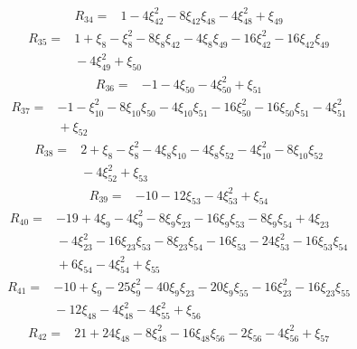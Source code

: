 \[
\begin{aligned}
 R_{34}={}&1-4\xi_{42}^{2}-8\xi_{42}\xi_{48}-4\xi_{48}^{2}+\xi_{49}
\end{aligned}
\]
\[
\begin{aligned}
 R_{35}={}&1+\xi_{8}-\xi_{8}^{2}-8\xi_{8}\xi_{42}-4\xi_{8}\xi_{49}-16\xi_{42}^{2}-16\xi_{42}\xi_{49}\\
 &{}-4\xi_{49}^{2}+\xi_{50}
\end{aligned}
\]
\[
\begin{aligned}
 R_{36}={}&-1-4\xi_{50}-4\xi_{50}^{2}+\xi_{51}
\end{aligned}
\]
\[
\begin{aligned}
 R_{37}={}&-1-\xi_{10}^{2}-8\xi_{10}\xi_{50}-4\xi_{10}\xi_{51}-16\xi_{50}^{2}-16\xi_{50}\xi_{51}-4\xi_{51}^{2}\\
 &{}+\xi_{52}
\end{aligned}
\]
\[
\begin{aligned}
 R_{38}={}&2+\xi_{8}-\xi_{8}^{2}-4\xi_{8}\xi_{10}-4\xi_{8}\xi_{52}-4\xi_{10}^{2}-8\xi_{10}\xi_{52}\\
 &{}-4\xi_{52}^{2}+\xi_{53}
\end{aligned}
\]
\[
\begin{aligned}
 R_{39}={}&-10-12\xi_{53}-4\xi_{53}^{2}+\xi_{54}
\end{aligned}
\]
\[
\begin{aligned}
 R_{40}={}&-19+4\xi_{9}-4\xi_{9}^{2}-8\xi_{9}\xi_{23}-16\xi_{9}\xi_{53}-8\xi_{9}\xi_{54}+4\xi_{23}\\
 &{}-4\xi_{23}^{2}-16\xi_{23}\xi_{53}-8\xi_{23}\xi_{54}-16\xi_{53}-24\xi_{53}^{2}-16\xi_{53}\xi_{54}\\
 &{}+6\xi_{54}-4\xi_{54}^{2}+\xi_{55}
\end{aligned}
\]
\[
\begin{aligned}
 R_{41}={}&-10+\xi_{9}-25\xi_{9}^{2}-40\xi_{9}\xi_{23}-20\xi_{9}\xi_{55}-16\xi_{23}^{2}-16\xi_{23}\xi_{55}\\
 &{}-12\xi_{48}-4\xi_{48}^{2}-4\xi_{55}^{2}+\xi_{56}
\end{aligned}
\]
\[
\begin{aligned}
 R_{42}={}&21+24\xi_{48}-8\xi_{48}^{2}-16\xi_{48}\xi_{56}-2\xi_{56}-4\xi_{56}^{2}+\xi_{57}
\end{aligned}
\]
